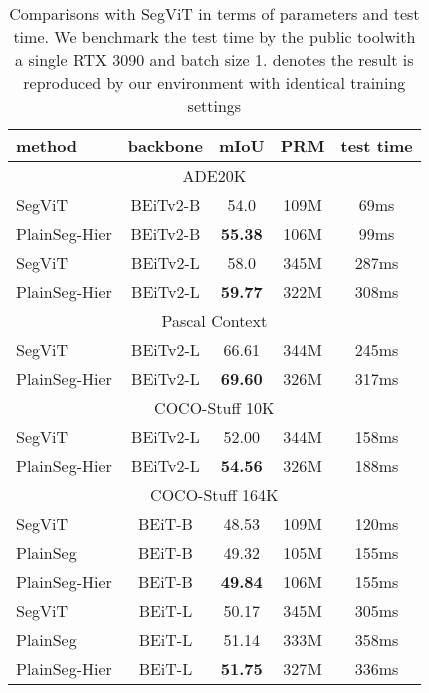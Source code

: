 \documentclass{article} \usepackage{iclr2024_conference,times}
\begin{document}
\begin{table}[h]
\small
\begin{minipage}[c]{0.56\textwidth}
\caption{Comparisons with SegViT \citep{zhang2022segvit,zhang2023segvitv2} in terms of parameters and test time. We benchmark the test time by the public tool\protect\footnotemark[1] with a single RTX 3090 and batch size 1.  denotes the result is reproduced by our environment with identical training settings}
\begin{center}
\label{tab:5}
\begin{tabular}{l|cccc}
\toprule
method   & backbone   &mIoU  & PRM  &test time \\\midrule
\multicolumn{5}{c}{ADE20K} \\ \midrule
SegViT  &BEiTv2-B  &54.0 &109M &  69ms\\
PlainSeg-Hier  &BEiTv2-B  &\textbf{55.38} &106M  & 99ms\\
SegViT  &BEiTv2-L  &58.0 &345M & 287ms \\
PlainSeg-Hier  &BEiTv2-L  &\textbf{59.77} &322M & 308ms \\\midrule\midrule
\multicolumn{5}{c}{Pascal Context} \\ \midrule
SegViT  &BEiTv2-L &66.61 &344M &245ms  \\
PlainSeg-Hier  &BEiTv2-L &\textbf{69.60}  &326M  &317ms \\\midrule\midrule
\multicolumn{5}{c}{COCO-Stuff 10K} \\ \midrule
SegViT  &BEiTv2-L &52.00 &344M   &158ms\\
PlainSeg-Hier  &BEiTv2-L &\textbf{54.56}  &326M &188ms  \\\midrule\midrule
\multicolumn{5}{c}{COCO-Stuff 164K} \\ \midrule
SegViT   &BEiT-B &48.53 &109M  &120ms \\
PlainSeg &BEiT-B &49.32  &105M &155ms   \\
PlainSeg-Hier &BEiT-B &\textbf{49.84}  &106M &155ms   \\
SegViT   &BEiT-L &50.17 &345M  &305ms  \\
PlainSeg &BEiT-L &51.14  &333M &358ms   \\
PlainSeg-Hier &BEiT-L &\textbf{51.75}  &327M &336ms   \\
\bottomrule
\end{tabular}
\end{center}
\end{minipage}
\hspace{.15in}
\begin{minipage}[c]{0.40\textwidth}

\end{minipage}
\end{table}
\end{document}
